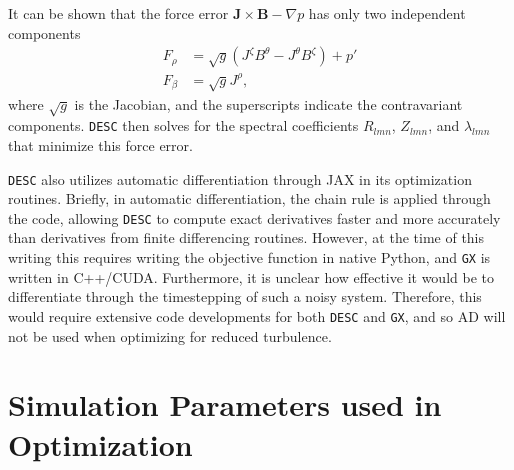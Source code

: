 \documentclass{jpp}
\begin{document}
It can be shown that the force error $\mathbf{J} \times \mathbf{B} - \nabla p$ has only two independent components
\begin{align}
    F_\rho &= \sqrt{g}\left(J^{\zeta}B^{\theta} - J^{\theta}B^{\zeta}\right) + p' \\
    F_\beta &= \sqrt{g}J^{\rho},
\end{align}
where $\sqrt{g}$ is the Jacobian, and the superscripts indicate the contravariant components. {\tt DESC} then solves for the spectral coefficients $R_{lmn}$, $Z_{lmn}$, and $\lambda_{lmn}$ that minimize this force error.

{\tt DESC} also utilizes automatic differentiation through JAX \citep{jax2018github} in its optimization routines. Briefly, in automatic differentiation, the chain rule is applied through the code, allowing {\tt DESC} to compute exact derivatives faster and more accurately than derivatives from finite differencing routines. However, at the time of this writing this requires writing the objective function in native Python, and {\tt GX} is written in C++/CUDA. Furthermore, it is unclear how effective it would be to differentiate through the timestepping of such a noisy system. Therefore, this would require extensive code developments for both {\tt DESC} and {\tt GX}, and so AD will not be used when optimizing for reduced turbulence.
\section{Simulation Parameters used in Optimization}\label{app sim param}
\end{document}
